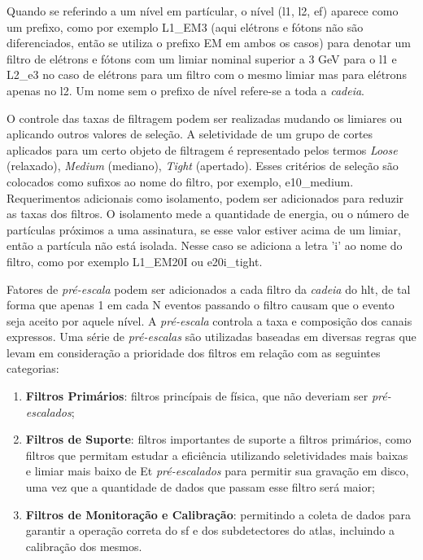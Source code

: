 Quando se referindo a um nível em partícular, o nível (\gls{l1}, \gls{l2},
\gls{ef}) aparece como um prefixo, como por exemplo L1\_EM3 (aqui elétrons e
fótons não são diferenciados, então se utiliza o prefixo EM em ambos os casos)
para denotar um filtro de elétrons e fótons com um limiar nominal superior a 3
GeV para o \gls{l1} e L2\_e3 no caso de elétrons para um filtro com o mesmo
limiar mas para elétrons apenas no \gls{l2}. Um nome sem o prefixo de nível
refere-se a toda a \emph{cadeia}.

O controle das taxas de filtragem podem ser realizadas mudando os limiares ou
aplicando outros valores de seleção. A seletividade de um grupo de cortes
aplicados para um certo objeto de filtragem é representado pelos termos
\emph{Loose} (relaxado), \emph{Medium} (mediano), \emph{Tight} (apertado). Esses
critérios de seleção são colocados como sufixos ao nome do filtro, por exemplo,
e10\_medium. Requerimentos adicionais como isolamento, podem ser adicionados
para reduzir as taxas dos filtros. O isolamento mede a quantidade de energia, ou
o número de partículas próximos a uma assinatura, se esse valor estiver acima de
um limiar, então a partícula não está isolada. Nesse caso se adiciona a letra
'i' ao nome do filtro, como por exemplo L1\_EM20I ou e20i\_tight.

Fatores de \emph{pré-escala} podem ser adicionados a cada filtro da 
\emph{cadeia} do \gls{hlt}, de tal forma que apenas 1 em cada N eventos passando
o filtro causam que o evento seja aceito por aquele nível. A \emph{pré-escala}
controla a taxa e composição dos canais expressos. Uma série de
\emph{pré-escalas} são utilizadas baseadas em diversas regras que levam em
consideração a prioridade dos filtros em relação com as seguintes categorias:

\begin{enumerate}
\item \textbf{Filtros Primários}: filtros princípais de física, que não deveriam
ser \emph{pré-escalados};
\item \textbf{Filtros de Suporte}: filtros importantes de suporte a filtros
primários, como filtros que permitam estudar a eficiência utilizando 
seletividades mais baixas e limiar mais baixo de \gls{Et} \emph{pré-escalados}
para permitir sua gravação em disco, uma vez que a quantidade de dados que
passam esse filtro será maior;
\item \textbf{Filtros de Monitoração e Calibração}: permitindo a coleta de dados
para garantir a operação correta do \gls{sf} e dos subdetectores do \gls{atlas},
incluindo a calibração dos mesmos. 
\end{enumerate}

